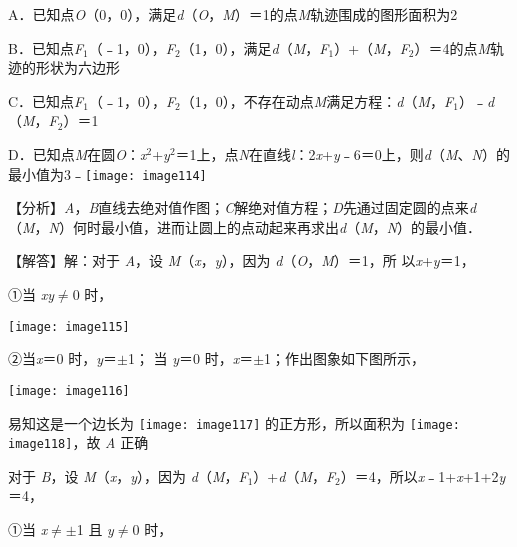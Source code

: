 \documentclass[a4paper,11pt,UTF8,twoside]{ctexart} %
\begin{document}
A．已知点\textit{O}（0，0），满足\textit{d}（\textit{O}，\textit{M}）＝1的点\textit{M}轨迹围成的图形面积为2 

B．已知点\textit{F}${}_{1}$（﹣1，0），\textit{F}${}_{2}$（1，0），满足\textit{d}（\textit{M}，\textit{F}${}_{1}$）+（\textit{M}，\textit{F}${}_{2}$）＝4的点\textit{M}轨迹的形状为六边形 

C．已知点\textit{F}${}_{1}$（﹣1，0），\textit{F}${}_{2}$（1，0），不存在动点\textit{M}满足方程：{\textbar}\textit{d}（\textit{M}，\textit{F}${}_{1}$）﹣\textit{d}（\textit{M}，\textit{F}${}_{2}$）{\textbar}＝1 

D．已知点\textit{M}在圆\textit{O}：\textit{x}${}^{2}$+\textit{y}${}^{2}$＝1上，点\textit{N}在直线\textit{l}：2\textit{x}+\textit{y}﹣6＝0上，则\textit{d}（\textit{M}、\textit{N}）的最小值为3﹣\texttt{[image: image114]}

【分析】\textit{A}，\textit{B}直线去绝对值作图；\textit{C}解绝对值方程；\textit{D}先通过固定圆的点来\textit{d}（\textit{M}，\textit{N}）何时最小值，进而让圆上的点动起来再求出\textit{d}（\textit{M}，\textit{N}）的最小值．

【解答】解：对于 \textit{A}，设 \textit{M}（\textit{x}，\textit{y}），因为 \textit{d}（\textit{O}，\textit{M}）＝1，所 以{\textbar}\textit{x}{\textbar}+{\textbar}\textit{y}{\textbar}＝1，

①当 \textit{xy}$\mathrm{\neq}$0 时，

\texttt{[image: image115]}

②当\textit{x}＝0 时，\textit{y}＝$\mathrm{\pm}$1； 当 \textit{y}＝0 时，\textit{x}＝$\mathrm{\pm}$1；作出图象如下图所示，

\texttt{[image: image116]}

易知这是一个边长为 \texttt{[image: image117]} 的正方形，所以面积为 \texttt{[image: image118]}，故 \textit{A} 正确

对于 \textit{B}，设 \textit{M}（\textit{x}，\textit{y}），因为 \textit{d}（\textit{M}，\textit{F}${}_{1}$）+\textit{d}（\textit{M}，\textit{F}${}_{2}$）＝4，所以{\textbar}\textit{x}﹣1{\textbar}+{\textbar}\textit{x}+1{\textbar}+2{\textbar}\textit{y}{\textbar}＝4，

①当 \textit{x}$\mathrm{\neq}$$\mathrm{\pm}$1 且 \textit{y}$\mathrm{\neq}$0 时，
\end{document}
